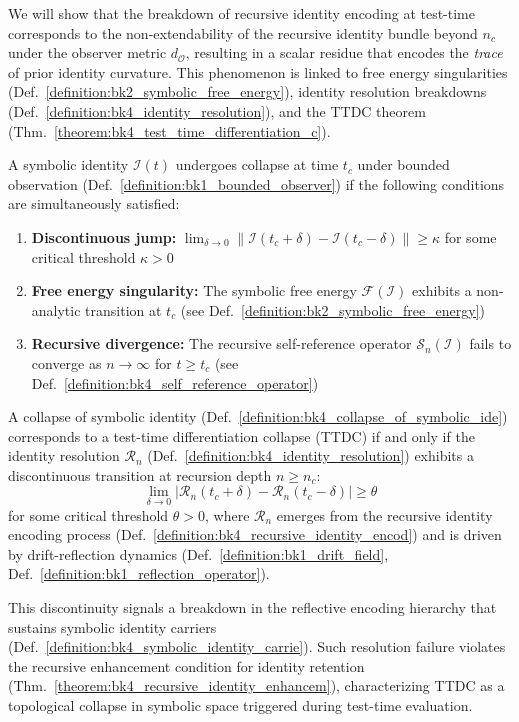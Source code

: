 We will show that the breakdown of recursive identity encoding at test-time corresponds to the non-extendability of the recursive identity bundle beyond $n_c$ under the observer metric $d_\mathcal{O}$, resulting in a scalar residue that encodes the \emph{trace} of prior identity curvature. This phenomenon is linked to free energy singularities (Def.~\ref{definition:bk2_symbolic_free_energy}), identity resolution breakdowns (Def.~\ref{definition:bk4_identity_resolution}), and the TTDC theorem (Thm.~\ref{theorem:bk4_test_time_differentiation_c}).

\begin{definition}
\label{definition:bk4_collapse_of_symbolic_ide}
A symbolic identity $\mathcal{I}(t)$ undergoes collapse at time $t_c$ under bounded observation (Def.~\ref{definition:bk1_bounded_observer}) if the following conditions are simultaneously satisfied:
\begin{enumerate}
    \item \textbf{Discontinuous jump:} $\lim_{\delta \to 0} \|\mathcal{I}(t_c + \delta) - \mathcal{I}(t_c - \delta)\| \geq \kappa$ for some critical threshold $\kappa > 0$
    \item \textbf{Free energy singularity:} The symbolic free energy $\mathcal{F}(\mathcal{I})$ exhibits a non-analytic transition at $t_c$ (see Def.~\ref{definition:bk2_symbolic_free_energy})
    \item \textbf{Recursive divergence:} The recursive self-reference operator $\mathcal{S}_n(\mathcal{I})$ fails to converge as $n \to \infty$ for $t \geq t_c$ (see Def.~\ref{definition:bk4_self_reference_operator})
\end{enumerate}
\end{definition}

\begin{theorem}
\label{theorem:bk4_test_time_differentiation_c}
A collapse of symbolic identity (Def.~\ref{definition:bk4_collapse_of_symbolic_ide}) corresponds to a test-time differentiation collapse (TTDC) if and only if the identity resolution $\mathcal{R}_n$ (Def.~\ref{definition:bk4_identity_resolution}) exhibits a discontinuous transition at recursion depth $n \geq n_c$:
\begin{equation}
    \lim_{\delta \to 0} \left| \mathcal{R}_n(t_c + \delta) - \mathcal{R}_n(t_c - \delta) \right| \geq \theta
\end{equation}
for some critical threshold $\theta > 0$, where $\mathcal{R}_n$ emerges from the recursive identity encoding process (Def.~\ref{definition:bk4_recursive_identity_encod}) and is driven by drift-reflection dynamics (Def.~\ref{definition:bk1_drift_field}, Def.~\ref{definition:bk1_reflection_operator}).

This discontinuity signals a breakdown in the reflective encoding hierarchy that sustains symbolic identity carriers (Def.~\ref{definition:bk4_symbolic_identity_carrie}). Such resolution failure violates the recursive enhancement condition for identity retention (Thm.~\ref{theorem:bk4_recursive_identity_enhancem}), characterizing TTDC as a topological collapse in symbolic space triggered during test-time evaluation.
\end{theorem}

